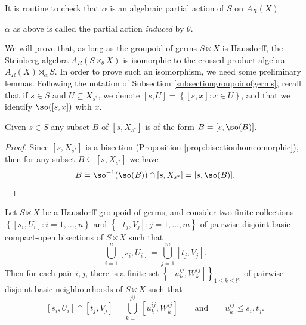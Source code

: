 It is routine to check that $\alpha$ is an algebraic partial action of $S$ on $A_R(X)$.

\begin{definition}\label{definitiondualpartialaction}
$\alpha$ as above is called the partial action \emph{induced} by $\theta$.
\end{definition}

We will prove that, as long as the groupoid of germs $S \ltimes X$ is Hausdorff, the Steinberg algebra $A_R(S\ltimes_\theta X)$ is isomorphic to the crossed product algebra $A_R(X) \rtimes_\alpha S$. In order to prove such an isomorphism, we need some preliminary lemmas. Following the notation of Subsection \ref{subsectiongroupoidofgerms}, recall that if $s\in S$ and $U\subseteq X_{s^*}$, we denote $[s,U]=\left\{[s,x]:x\in U\right\}$, and that we identify $\so([s,x])$ with $x$.

\begin{lemma}\label{lem:basicelementsubset}
Given $s\in S$ any subset $B$ of $[s,X_{s^*}]$ is of the form $B=[s,\so(B)]$.
\end{lemma}

\begin{proof}
Since $[s,X_{s^*}]$ is a bisection (Proposition \ref{prop:bisectionhomeomorphic}), then for any subset $B\subseteq[s,X_{s^*}]$ we have
\[B=\so^{-1}(\so(B))\cap[s,X_{s^*}]=[s,\so(B)].\qedhere\]
\end{proof}


\begin{lemma}\label{lem:unionbasicelements}
Let $S\ltimes X$ be a Hausdorff groupoid of germs, and consider two finite collections $\left\lbrace\left[s_i,U_i\right]:i=1,\ldots,n\right\}$ and $\left\lbrace\left[t_j,V_j\right]:j=1,\ldots,m\right\rbrace$ of pairwise disjoint basic compact-open bisections of $S\ltimes X$ such that 
\[\bigcup_{i=1}^n\left[s_i,U_i\right]=\bigcup_{j=1}^m\left[t_j,V_j\right].\]
Then for each pair $i,j$, there is a finite set  $\left\lbrace\left[u_k^{ij},W_k^{ij}\right]\right\rbrace_{1\leq k\leq l^{ij}}$ of pairwise disjoint basic neighbourhoods of $S\ltimes X$ such that 
\[\left[s_i,U_i\right]\cap\left[t_j,V_j\right]=\bigcup_{k=1}^{l^{ij}}\left[u_k^{ij},W_k^{ij}\right]\qquad\text{and}\qquad u_k^{ij} \leq s_i,t_j.\]
\end{lemma}

